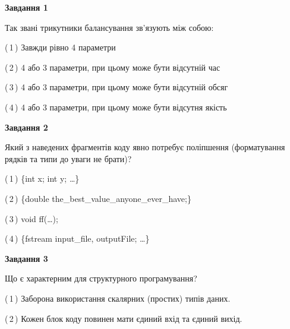 \documentclass[10pt, ukrainian]{article}
\begin{document}
{
\begin {large}
{\begin {center}\textbf{Завдання 1}\end {center}}\par
Так звані трикутники балансування зв'язують між собою:\par
\vspace{2mm}



(\,1\,) Завжди рівно 4 параметри%



(\,2\,) 4 або 3 параметри, при цьому може бути відсутній час%



(\,3\,) 4 або 3 параметри, при цьому може бути відсутній обсяг %



(\,4\,) 4 або 3 параметри, при цьому може бути відсутня якість%


{\begin {center}\textbf{Завдання 2}\end {center}}\par
Який з наведених фрагментів коду явно потребує поліпшення (форматування рядків та типи до уваги не брати)?\par
\vspace{2mm}



(\,1\,) \{int x; int y; …\}%



(\,2\,) \{double the\_best\_value\_anyone\_ever\_have;\} %



(\,3\,) void ff(…);%



(\,4\,) \{fstream input\_file, outputFile; …\}%


{\begin {center}\textbf{Завдання 3}\end {center}}\par
Що є характерним для структурного програмування?\par
\vspace{2mm}



(\,1\,) Заборона використання скалярних (простих) типів даних. %



(\,2\,) Кожен блок коду повинен мати єдиний вхід та єдиний вихід.%




\end{large}}
\end{document}
